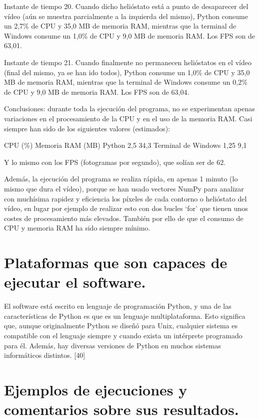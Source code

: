 \documentclass[12pt]{article}
\begin{document}
Instante de tiempo 20. Cuando dicho helióstato está a punto de desaparecer del vídeo (aún se muestra parcialmente a la izquierda del mismo), Python consume un 2,7\% de CPU y 35,0 MB de memoria RAM, mientras que la terminal de Windows consume un 1,0\% de CPU y 9,0 MB de memoria RAM. Los FPS son de 63,01.




Instante de tiempo 21. Cuando finalmente no permanecen helióstatos en el vídeo (final del mismo, ya se han ido todos), Python consume un 1,0\% de CPU y 35,0 MB de memoria RAM, mientras que la terminal de Windows consume un 0,2\% de CPU y 9,0 MB de memoria RAM. Los FPS son de 63,04.

Conclusiones: durante toda la ejecución del programa, no se experimentan apenas variaciones en el procesamiento de la CPU y en el uso de la memoria RAM. Casi siempre han sido de los siguientes valores (estimados):

				CPU (\%)	Memoria RAM (MB)
Python				2,5		34,3
Terminal de Windows		1,25		9,1

Y lo mismo con los FPS (fotogramas por segundo), que solían ser de 62.

Además, la ejecución del programa se realiza rápida, en apenas 1 minuto (lo mismo que dura el vídeo), porque se han usado vectores NumPy para analizar con muchísima rapidez y eficiencia los píxeles de cada contorno o helióstato del vídeo, en lugar por ejemplo de realizar esto con dos bucles ‘for’ que tienen unos costes de procesamiento más elevados. También por ello de que el consumo de CPU y memoria RAM ha sido siempre mínimo.


\section{Plataformas que son capaces de ejecutar el software.}

El software está escrito en lenguaje de programación Python, y una de las características de Python es que es un lenguaje multiplataforma. Esto significa que, aunque originalmente Python se diseñó para Unix, cualquier sistema es compatible con el lenguaje siempre y cuando exista un intérprete programado para él. Además, hay diversas versiones de Python en muchos sistemas informáticos distintos. [40]


\section{Ejemplos de ejecuciones y comentarios sobre sus resultados.}
\end{document}
